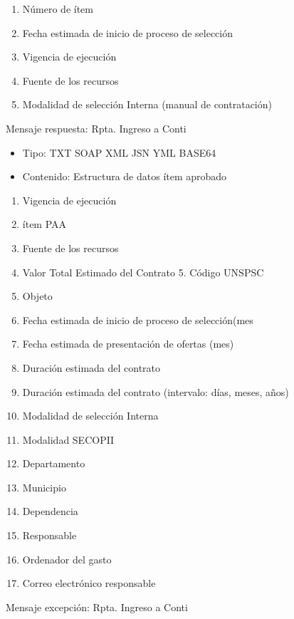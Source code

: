 \documentclass[
  paper=a4,
  ,captions=tableheading
]{scrartcl}
\providecommand{\tightlist}{%
  \setlength{\itemsep}{0pt}\setlength{\parskip}{0pt}}
\begin{document}
\begin{enumerate}
\def\labelenumi{\arabic{enumi}.}
\tightlist
\item
  Número de ítem
\item
  Fecha estimada de inicio de proceso de selección
\item
  Vigencia de ejecución
\item
  Fuente de los recursos
\item
  Modalidad de selección Interna (manual de contratación)
\end{enumerate}

Mensaje respuesta: Rpta. Ingreso a Conti

\begin{itemize}
\tightlist
\item
  Tipo: TXT \textbar{} SOAP \textbar{} XML \textbar{} JSN \textbar{} YML
  \textbar{} BASE64
\item
  Contenido: Estructura de datos ítem aprobado
\end{itemize}

\begin{enumerate}
\def\labelenumi{\arabic{enumi}.}
\tightlist
\item
  Vigencia de ejecución
\item
  ítem PAA
\item
  Fuente de los recursos
\item
  Valor Total Estimado del Contrato 5. Código UNSPSC
\item
  Objeto
\item
  Fecha estimada de inicio de proceso de selección(mes
\item
  Fecha estimada de presentación de ofertas (mes)
\item
  Duración estimada del contrato
\item
  Duración estimada del contrato (intervalo: días, meses, años)
\item
  Modalidad de selección Interna
\item
  Modalidad SECOPII
\item
  Departamento
\item
  Municipio
\item
  Dependencia
\item
  Responsable
\item
  Ordenador del gasto
\item
  Correo electrónico responsable
\end{enumerate}

Mensaje excepción: Rpta. Ingreso a Conti
\end{document}
